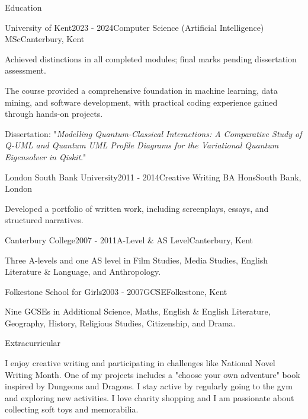 \documentclass[
	11pt, %
]{resume} %
\begin{document}
\begin{rSection}{Education}

\begin{rSubsection}{University of Kent}{2023 - 2024}{Computer Science (Artificial Intelligence) MSc}{Canterbury, Kent}
    \item Achieved distinctions in all completed modules; final marks pending dissertation assessment. 
    \item The course provided a comprehensive foundation in machine learning, data mining, and software
	development, with practical coding experience gained through hands-on projects.
    \item Dissertation: "\textit{Modelling Quantum-Classical Interactions: A Comparative Study of Q-UML and
	Quantum UML Profile Diagrams for the Variational Quantum Eigensolver in Qiskit}."
\end{rSubsection}

\begin{rSubsection}{London South Bank University}{2011 - 2014}{Creative Writing BA Hons}{South Bank, London}
    \item Developed a portfolio of written work, including screenplays, essays, and structured narratives.
\end{rSubsection}

\begin{rSubsection}{Canterbury College}{2007 - 2011}{A-Level \& AS Level}{Canterbury, Kent}
    \item Three A-levels and one AS level in Film Studies, Media Studies, English Literature \& Language, and
	Anthropology.
\end{rSubsection}

\begin{rSubsection}{Folkestone School for Girls}{2003 - 2007}{GCSE}{Folkestone, Kent}
    \item Nine GCSEs in Additional Science, Maths, English \& English Literature, Geography, History,
	Religious Studies, Citizenship, and Drama.
\end{rSubsection}

\end{rSection}


\begin{rSection}{Extracurricular}

I enjoy creative writing and participating in challenges like National Novel Writing Month. One of my
projects includes a "choose your own adventure" book inspired by Dungeons and Dragons. I stay active by
regularly going to the gym and exploring new activities. I love charity shopping and I am passionate about
collecting soft toys and memorabilia.

\end{rSection}
\end{document}
